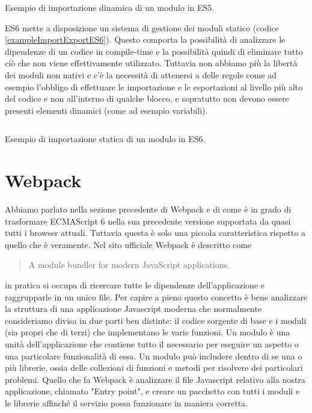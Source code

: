 \begin{listing}[ht]
\inputminted{Javascript}{sources/exampleDynamicImportES5.js}
\caption{Esempio di importazione dinamica di un modulo in ES5.} 
\label{exampleDynamicImportES5}
\end{listing}

\noindent
ES6 mette a disposizione un sistema di gestione dei moduli statico (codice \ref{exampleImportExportES6}). Questo comporta la possibilità di analizzare le dipendenze di un codice in compile-time e la possibilità quindi di eliminare tutto ciò che non viene effettivamente utilizzato.
Tuttavia non abbiamo più la libertà dei moduli non nativi e c'è la necessità di attenersi a delle regole come ad esempio l'obbligo di effettuare le importazione e le esportazioni al livello più alto del codice e non all'interno di qualche blocco, e sopratutto non devono essere presenti elementi dinamici (come ad esempio variabili).

\begin{listing}[ht]
\inputminted{Javascript}{sources/exampleImportExportES6.js}
\caption{Esempio di importazione statica di un modulo in ES6.} 
\label{exampleImportExportES6} 
\end{listing}


\section{Webpack}
Abbiamo parlato nella sezione precedente di Webpack e di come è in grado di trasformare ECMAScript 6 nella sua precedente versione supportata da quasi tutti i browser attuali. Tuttavia questa è solo una piccola caratteristica rispetto a quello che è veramente.
Nel sito ufficiale Webpack è descritto come \blockquote{A module bundler for modern JavaScript applications.} in pratica si occupa di ricercare tutte le dipendenze dell'applicazione e raggrupparle in un unico file. 
Per capire a pieno questo concetto è bene analizzare la struttura di una applicazione Javascript moderna che normalmente consideriamo divisa in due parti ben distinte: il codice sorgente di base e i moduli (sia propri che di terzi) che implementano le varie funzioni. Un modulo è una unità dell'applicazione che contiene tutto il necessario per eseguire un aspetto o una particolare funzionalità di essa. Un modulo può includere dentro di se una o più librerie, ossia delle collezioni di funzioni e metodi per risolvere dei particolari problemi. Quello che fa Webpack è analizzare il file Javascript relativo alla nostra applicazione, chiamato "Entry point", e creare un pacchetto con tutti i moduli e le librerie affinché il servizio possa funzionare in maniera corretta. 

